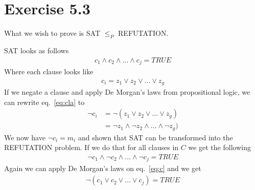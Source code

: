 \section*{Exercise 5.3}
What we wish to prove is SAT $\leq _P$ REFUTATION.

SAT looks as follows
\begin{align*}
	c_1 \wedge c_2 \wedge \ldots \wedge c_j = TRUE
\end{align*}
Where each clause looks like
\begin{align}
	c_i = z_1 \lor z_2 \lor \ldots \lor z_g	 \label{eq:cla}
\end{align}
If we negate a clause and apply De Morgan's laws from propositional logic, we can rewrite eq.~\ref{eq:cla} to
\begin{align*}
	\neg c_i &= \neg ( z_1 \lor z_2 \lor \ldots \lor z_g) \\
	&= \neg z_1 \wedge \neg z_2 \wedge \ldots \wedge \neg z_g)
\end{align*}
We now have $\neg c_i = m_i$ and shown that SAT can be transformed into the REFUTATION problem. If we do that for all clauses in $C$ we get the following
\begin{align}
	\neg c_1 \wedge \neg c_2 \wedge \ldots \wedge \neg c_j = TRUE \label{eq:c}
\end{align}
Again we can apply De Morgan's laws on eq.~\ref{eq:c} and we get
\begin{align*}
	\neg (c_1 \lor c_2 \lor \ldots \lor c_j) = TRUE
\end{align*}